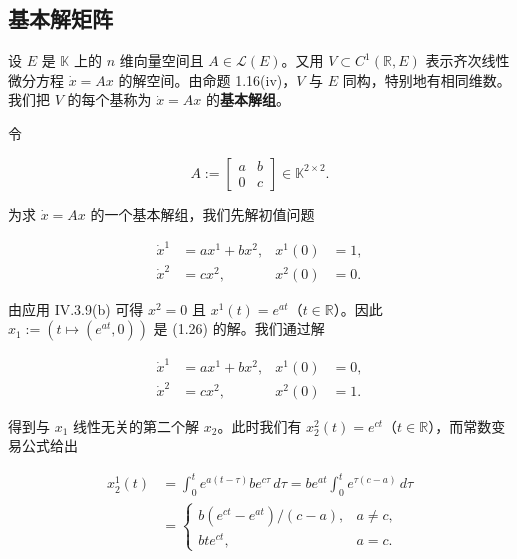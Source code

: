 \subsection*{基本解矩阵}

设 $ E $ 是 $ \mathbb{K} $ 上的 $ n $ 维向量空间且 $ A \in \mathcal{L}(E) $。又用 $ V \subset C^{1}(\mathbb{R}, E) $ 表示齐次线性微分方程 $ \dot{x} = Ax $ 的解空间。由命题 1.16(iv)，$ V $ 与 $ E $ 同构，特别地有相同维数。我们把 $ V $ 的每个基称为 $ \dot{x} = Ax $ 的\textbf{基本解组}。

\begin{example}

\begin{items}
\item

令

\begin{equation*}
A := \begin{bmatrix} a & b \\ 0 & c \end{bmatrix} \in \mathbb{K}^{2\times 2} .
\end{equation*}

为求 $ \dot{x} = Ax $ 的一个基本解组，我们先解初值问题

\begin{equation}
\begin{aligned}
\dot{x}^{1} &= ax^{1} + bx^{2} , & x^{1}(0) &= 1 , \\ \dot{x}^{2} &= cx^{2} , & x^{2}(0) &= 0 .
\end{aligned}\tag{1.26}
\end{equation}

由应用 IV.3.9(b) 可得 $ x^{2} = 0 $ 且 $ x^{1}(t) = e^{at} $（$ t \in \mathbb{R} $）。因此 $ x_{1} := (t \mapsto (e^{at},0)) $ 是 (1.26) 的解。我们通过解

\begin{equation*}
\begin{aligned}
\dot{x}^{1} &= ax^{1} + bx^{2} , & x^{1}(0) &= 0 , \\ \dot{x}^{2} &= cx^{2} , & x^{2}(0) &= 1 .
\end{aligned}
\end{equation*}

得到与 $ x_{1} $ 线性无关的第二个解 $ x_{2} $。此时我们有 $ x_{2}^{2}(t) = e^{ct} $（$ t \in \mathbb{R} $），而常数变易公式给出

\begin{equation*}
\begin{aligned}
x_{2}^{1}(t) &= \int_{0}^{t}e^{a(t-\tau)}be^{c\tau}\,d\tau = be^{at}\int_{0}^{t}e^{\tau(c-a)}\,d\tau \\ &= \begin{cases} b(e^{ct} - e^{at})/(c - a) , & a \ne c , \\ bte^{ct} , & a = c . \end{cases}
\end{aligned}
\end{equation*}


\end{items}
\end{example}
